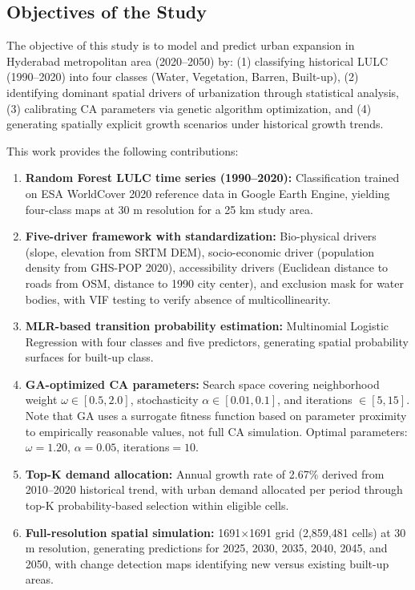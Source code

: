 \documentclass[12pt,a4paper]{article}
\begin{document}
\subsection{Objectives of the Study}
The objective of this study is to model and predict urban expansion in Hyderabad metropolitan area (2020--2050) by: (1) classifying historical LULC (1990--2020) into four classes (Water, Vegetation, Barren, Built-up), (2) identifying dominant spatial drivers of urbanization through statistical analysis, (3) calibrating CA parameters via genetic algorithm optimization, and (4) generating spatially explicit growth scenarios under historical growth trends.

This work provides the following contributions:

\begin{enumerate}
\item \textbf{Random Forest LULC time series (1990--2020):} Classification trained on ESA WorldCover 2020 reference data in Google Earth Engine, yielding four-class maps at 30 m resolution for a 25 km study area.

\item \textbf{Five-driver framework with standardization:} Bio-physical drivers (slope, elevation from SRTM DEM), socio-economic driver (population density from GHS-POP 2020), accessibility drivers (Euclidean distance to roads from OSM, distance to 1990 city center), and exclusion mask for water bodies, with VIF testing to verify absence of multicollinearity.

\item \textbf{MLR-based transition probability estimation:} Multinomial Logistic Regression with four classes and five predictors, generating spatial probability surfaces for built-up class.

\item \textbf{GA-optimized CA parameters:} Search space covering neighborhood weight $\omega \in [0.5, 2.0]$, stochasticity $\alpha \in [0.01, 0.1]$, and iterations $\in [5, 15]$. Note that GA uses a surrogate fitness function based on parameter proximity to empirically reasonable values, not full CA simulation. Optimal parameters: $\omega=1.20$, $\alpha=0.05$, iterations$=10$.

\item \textbf{Top-K demand allocation:} Annual growth rate of 2.67\% derived from 2010--2020 historical trend, with urban demand allocated per period through top-K probability-based selection within eligible cells.

\item \textbf{Full-resolution spatial simulation:} 1691$\times$1691 grid (2,859,481 cells) at 30 m resolution, generating predictions for 2025, 2030, 2035, 2040, 2045, and 2050, with change detection maps identifying new versus existing built-up areas.
\end{enumerate}
\end{document}
